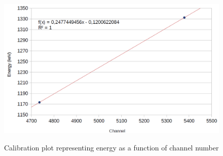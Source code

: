\documentclass[11pt,a4paper]{article}
\begin{document}
\begin{figure}[!h]
\centering
\includegraphics[scale=0.6]{calibration.png}
\label{calibration}
\caption{Calibration plot representing energy as a function of channel number}
\end{figure}

\begin{figure}

\end{figure}
\end{document}
